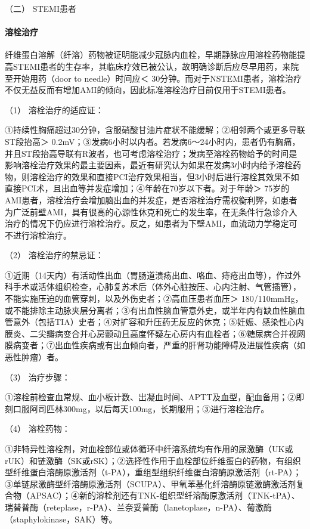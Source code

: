 \hypertarget{text00312.htmlux5cux23CHP10-8-2-3-4-2}{}
（二） STEMI患者

\paragraph{溶栓治疗}

纤维蛋白溶解（纤溶）药物被证明能减少冠脉内血栓，早期静脉应用溶栓药物能提高STEMI患者的生存率，其临床疗效已被公认，故明确诊断后应尽早用药，来院至开始用药（door
to needle）时间应＜
30分钟。而对于NSTEMI患者，溶栓治疗不仅无益反而有增加AMI的倾向，因此标准溶栓治疗目前仅用于STEMI患者。

\hypertarget{text00312.htmlux5cux23CHP10-8-2-3-4-2-1-1}{}
（1） 溶栓治疗的适应证：

①持续性胸痛超过30分钟，含服硝酸甘油片症状不能缓解；②相邻两个或更多导联ST段抬高＞
0.2mV；③发病6小时以内者。若发病6～24小时内，患者仍有胸痛，并且ST段抬高导联有R波者，也可考虑溶栓治疗；发病至溶栓药物给予的时间是影响溶栓治疗效果的最主要因素，最近有研究认为如果在发病3小时内给予溶栓药物，则溶栓治疗的效果和直接PCI治疗效果相当，但3小时后进行溶栓其效果不如直接PCI术，且出血等并发症增加；④年龄在70岁以下者。对于年龄＞
75岁的AMI患者，溶栓治疗会增加脑出血的并发症，是否溶栓治疗需权衡利弊，如患者为广泛前壁AMI，具有很高的心源性休克和死亡的发生率，在无条件行急诊介入治疗的情况下仍应进行溶栓治疗。反之，如患者为下壁AMI，血流动力学稳定可不进行溶栓治疗。

\hypertarget{text00312.htmlux5cux23CHP10-8-2-3-4-2-1-2}{}
（2） 溶栓治疗的禁忌证：

①近期（14天内）有活动性出血（胃肠道溃疡出血、咯血、痔疮出血等），作过外科手术或活体组织检查，心肺复苏术后（体外心脏按压、心内注射、气管插管），不能实施压迫的血管穿刺，以及外伤史者；②高血压患者血压＞
180/110mmHg，或不能排除主动脉夹层分离者；③有出血性脑血管意外史，或半年内有缺血性脑血管意外（包括TIA）史者；④对扩容和升压药无反应的休克；⑤妊娠、感染性心内膜炎、二尖瓣病变合并心房颤动且高度怀疑左心房内有血栓者；⑥糖尿病合并视网膜病变者；⑦出血性疾病或有出血倾向者，严重的肝肾功能障碍及进展性疾病（如恶性肿瘤）者。

\hypertarget{text00312.htmlux5cux23CHP10-8-2-3-4-2-1-3}{}
（3） 治疗步骤：

①溶栓前检查血常规、血小板计数、出凝血时间、APTT及血型，配血备用；②即刻口服阿司匹林300mg，以后每天100mg，长期服用；③进行溶栓治疗。

\hypertarget{text00312.htmlux5cux23CHP10-8-2-3-4-2-1-4}{}
（4） 溶栓药物：

①非特异性溶栓剂，对血栓部位或体循环中纤溶系统均有作用的尿激酶（UK或rUK）和链激酶（SK或rSK）；②选择性作用于血栓部位纤维蛋白的药物，有组织型纤维蛋白溶酶原激活剂（t-PA），重组型组织纤维蛋白溶酶原激活剂（rt-PA）；③单链尿激酶型纤溶酶原激活剂（SCUPA）、甲氧苯基化纤溶酶原链激酶激活剂复合物（APSAC）；④新的溶栓剂还有TNK-组织型纤溶酶原激活剂（TNK-tPA）、瑞替普酶（reteplase，r-PA）、兰奈妥普酶（lanetoplase，n-PA）、葡激酶（staphylokinase，SAK）等。

